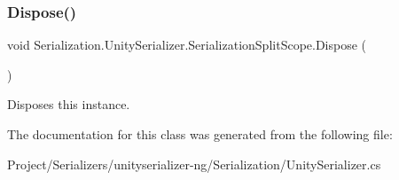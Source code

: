 \subsubsection{\texorpdfstring{Dispose()}{Dispose()}}
{\footnotesize\ttfamily void Serialization.\+Unity\+Serializer.\+Serialization\+Split\+Scope.\+Dispose (\begin{DoxyParamCaption}{ }\end{DoxyParamCaption})\hspace{0.3cm}{\ttfamily [inline]}}



Disposes this instance. 



The documentation for this class was generated from the following file\+:\begin{DoxyCompactItemize}
\item 
Project/\+Serializers/unityserializer-\/ng/\+Serialization/Unity\+Serializer.\+cs\end{DoxyCompactItemize}
